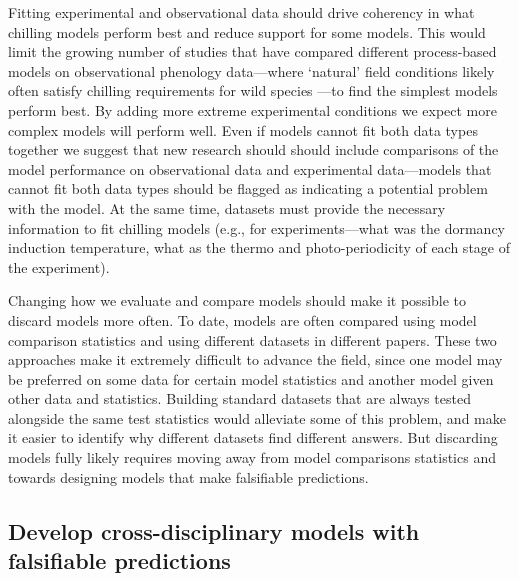 \documentclass[11pt]{article}
\begin{document}
Fitting experimental and observational data should drive coherency in what chilling models perform best and reduce support for some models. This would limit the growing number of studies that have compared different process-based models on observational phenology data---where `natural' field conditions likely often satisfy chilling requirements for wild species \citep{basler2016evaluating,hufkens2018integrated}---to find the simplest models perform best. By adding more extreme experimental conditions we expect more complex models will perform well. Even if models cannot fit both data types together we suggest that new research should should include comparisons of the model performance on observational data and experimental data---models that cannot fit both data types should be flagged as indicating a potential problem with the model.  At the same time, datasets must provide the necessary information to fit chilling models (e.g., for experiments---what was the dormancy induction temperature, what as the thermo and photo-periodicity of each stage of the experiment). 

Changing how we evaluate and compare models should make it possible to discard models more often. To date, models are often compared using model comparison statistics and using different datasets in different papers. These two approaches make it extremely difficult to advance the field, since one model may be preferred on some data for certain model statistics and another model given other data and statistics. Building standard datasets that are always tested alongside the same test statistics would alleviate some of this problem, and make it easier to identify why different datasets find different answers. But discarding models fully likely requires moving away from model comparisons statistics and towards designing models that make falsifiable predictions.


\subsection*{Develop cross-disciplinary models with falsifiable predictions} 
\end{document}
